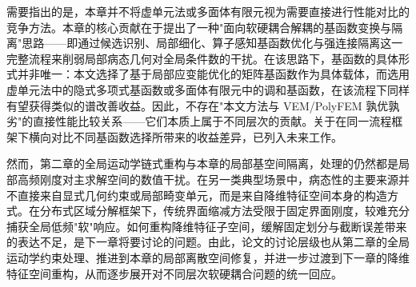 需要指出的是，本章并不将虚单元法或多面体有限元视为需要直接进行性能对比的竞争方法。本章的核心贡献在于提出了一种"面向软硬耦合解耦的基函数变换与隔离"思路——即通过候选识别、局部细化、算子感知基函数优化与强连接隔离这一完整流程来削弱局部病态几何对全局条件数的干扰。在该思路下，基函数的具体形式并非唯一：本文选择了基于局部应变能优化的矩阵基函数作为具体载体，而选用虚单元法中的隐式多项式基函数或多面体有限元中的调和基函数，在该流程下同样有望获得类似的谱改善收益。因此，不存在"本文方法与 VEM/PolyFEM 孰优孰劣"的直接性能比较关系——它们本质上属于不同层次的贡献。关于在同一流程框架下横向对比不同基函数选择所带来的收益差异，已列入未来工作。

然而，第二章的全局运动学链式重构与本章的局部基空间隔离，处理的仍然都是局部高频刚度对主求解空间的数值干扰。在另一类典型场景中，病态性的主要来源并不直接来自显式几何约束或局部畸变单元，而是来自降维特征空间本身的构造方式。在分布式区域分解框架下，传统界面缩减方法受限于固定界面刚度，较难充分捕获全局低频"软"响应。如何重构降维特征子空间，缓解固定划分与截断误差带来的表达不足，是下一章将要讨论的问题。由此，论文的讨论层级也从第二章的全局运动学约束处理、推进到本章的局部离散空间修复，并进一步过渡到下一章的降维特征空间重构，从而逐步展开对不同层次软硬耦合问题的统一回应。
